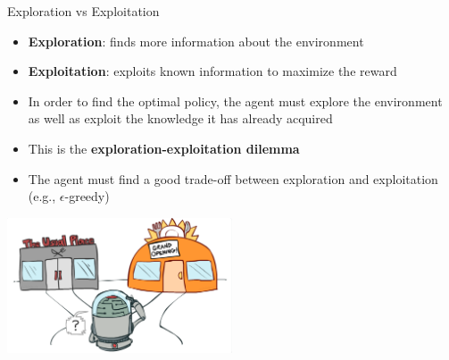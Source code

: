 \documentclass[presentation, 9pt]{beamer}\mode<presentation>{\usetheme{AMSBolognaFC}}
\begin{document}
\begin{frame}{Exploration vs Exploitation}
	\begin{itemize}
		\item \textbf{Exploration}: finds more information about the environment 
		\item \textbf{Exploitation}: exploits known information to maximize the reward 
		\item In order to find the optimal policy, the agent must explore the environment as well as exploit the knowledge it has already acquired
		\item This is the \textbf{exploration-exploitation dilemma}
		\item The agent must find a good trade-off between exploration and exploitation (e.g., $\epsilon$-greedy)
	\end{itemize}
\centering
\includegraphics[width=0.5\textwidth]{img/exploration-exploitation.png}
\end{frame}
\end{document}
